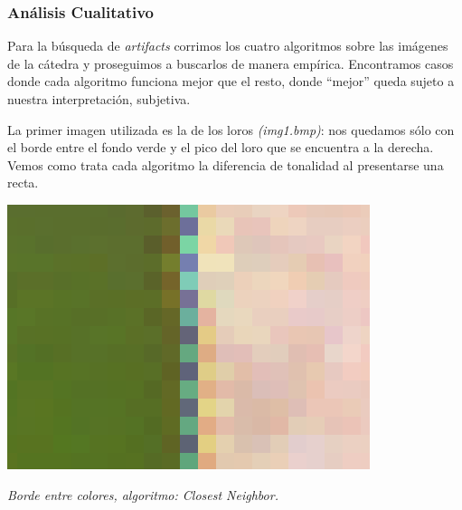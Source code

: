 \subsubsection{Análisis Cualitativo}

Para la búsqueda de \textit{artifacts} corrimos los cuatro algoritmos sobre las imágenes de la cátedra y proseguimos a buscarlos de manera empírica. Encontramos casos donde cada algoritmo funciona mejor que el resto, donde ``mejor'' queda sujeto a nuestra interpretación, subjetiva.

\vspace{\baselineskip}

La primer imagen utilizada es la de los loros \textit{(img1.bmp)}: nos quedamos sólo con el borde entre el fondo verde y el pico del loro que se encuentra a la derecha. Vemos como trata cada algoritmo la diferencia de tonalidad al presentarse una recta. 

\vspace{\baselineskip}

	\begin{center}
		\includegraphics[scale=.5]{../enunciado/images_files/cualitativo/pico_loro_closest.png}
		\vspace{2pt}
		\par
		\footnotesize\textit{Borde entre colores, algoritmo: Closest Neighbor.}
	\end{center}

